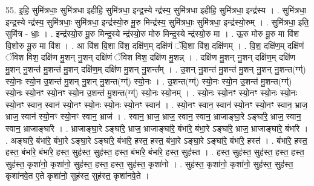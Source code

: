 \documentclass[17pt]{extarticle}
\begin{document}
55. इ॒हि॒ सुमि॑त्रधाः॒ सुमि॑त्रधा इहीहि॒ सुमि॑त्रधा॒ इन्द्र॒स्ये न्द्र॑स्य॒ सुमि॑त्रधा इहीहि॒ सुमि॑त्रधा॒ इन्द्र॑स्य । . सुमि॑त्रधा॒ इन्द्र॒स्ये न्द्र॑स्य॒ सुमि॑त्रधाः॒ सुमि॑त्रधा॒ इन्द्र॑स्यो॒रु मू॒रु मिन्द्र॑स्य॒ सुमि॑त्रधाः॒ सुमि॑त्रधा॒ इन्द्र॑स्यो॒रुम् । . सुमि॑त्रधा॒ इति॒ सुमि॑त्र - धाः॒ । . इन्द्र॑स्यो॒रु मू॒रु मिन्द्र॒स्ये न्द्र॑स्यो॒रु मोरु मिन्द्र॒स्ये न्द्र॑स्यो॒रु मा । . ऊ॒रु मोरु मू॒रु मा वि॑श वि॒शोरु मू॒रु मा वि॑श । . आ वि॑श वि॒शा वि॑श॒ दक्षि॑ण॒म् दक्षि॑णं ॅवि॒शा वि॑श॒ दक्षि॑णम् । . वि॒श॒ दक्षि॑ण॒म् दक्षि॑णं ॅविश विश॒ दक्षि॑ण मु॒शन् नु॒शन् दक्षि॑णं ॅविश विश॒ दक्षि॑ण मु॒शन्न् । . दक्षि॑ण मु॒शन् नु॒शन् दक्षि॑ण॒म् दक्षि॑ण मु॒शन् नु॒शन्त॑ मु॒शन्त॑ मु॒शन् दक्षि॑ण॒म् दक्षि॑ण 
मु॒शन् नु॒शन्त᳚म् । . उ॒शन् नु॒शन्त॑ मु॒शन्त॑ मु॒शन् नु॒शन् नु॒शन्त(ग्ग्॑) स्यो॒नः स्यो॒न उ॒शन्त॑ मु॒शन् नु॒शन् नु॒शन्त(ग्ग्॑) स्यो॒नः । . उ॒शन्त(ग्ग्॑) स्यो॒नः स्यो॒न उ॒शन्त॑ मु॒शन्त(ग्ग्॑) स्यो॒नः स्यो॒नꣳ स्यो॒नꣳ स्यो॒न उ॒शन्त॑ मु॒शन्त(ग्ग्॑) स्यो॒नः स्यो॒नम् । . स्यो॒नः स्यो॒नꣳ स्यो॒नꣳ स्यो॒नः स्यो॒नः स्यो॒नꣳ स्वान॒ स्वान॑ स्यो॒नꣳ स्यो॒नः स्यो॒नः स्यो॒नꣳ स्वान॑ । . स्यो॒नꣳ स्वान॒ स्वान॑ स्यो॒नꣳ स्यो॒नꣳ स्वान॒ भ्राज॒ भ्राज॒ स्वान॑ स्यो॒नꣳ स्यो॒नꣳ स्वान॒ भ्राज॑ । . स्वान॒ भ्राज॒ भ्राज॒ स्वान॒ स्वान॒ भ्राजाङ्घा॒रे ऽङ्घा॑रे॒ भ्राज॒ स्वान॒ स्वान॒ भ्राजाङ्घा॑रे । . भ्राजाङ्घा॒रे ऽङ्घा॑रे॒ भ्राज॒ भ्राजाङ्घा॑रे॒ बंभा॑रे॒ बंभा॒रे ऽङ्घा॑रे॒ भ्राज॒ भ्राजाङ्घा॑रे॒ बंभा॑रे । . अङ्घा॑रे॒ बंभा॑रे॒ बंभा॒रे ऽङ्घा॒रे ऽङ्घा॑रे॒ बंभा॑रे॒ हस्त॒ हस्त॒ बंभा॒रे ऽङ्घा॒रे ऽङ्घा॑रे॒ बंभा॑रे॒ हस्त॑ । . बंभा॑रे॒ हस्त॒ हस्त॒ बंभा॑रे॒ बंभा॑रे॒ हस्त॒ सुह॑स्त॒ सुह॑स्त॒ हस्त॒ बंभा॑रे॒ बंभा॑रे॒ हस्त॒ सुह॑स्त । . हस्त॒ सुह॑स्त॒ सुह॑स्त॒ हस्त॒ हस्त॒ सुह॑स्त॒ कृशा॑नो॒ कृशा॑नो॒ सुह॑स्त॒ हस्त॒ हस्त॒ सुह॑स्त॒ कृशा॑नो । . सुह॑स्त॒ कृशा॑नो॒ कृशा॑नो॒ सुह॑स्त॒ सुह॑स्त॒ कृशा॑नवे॒त ए॒ते कृशा॑नो॒ सुह॑स्त॒ सुह॑स्त॒ कृशा॑नवे॒ते । \newline
\end{document}
